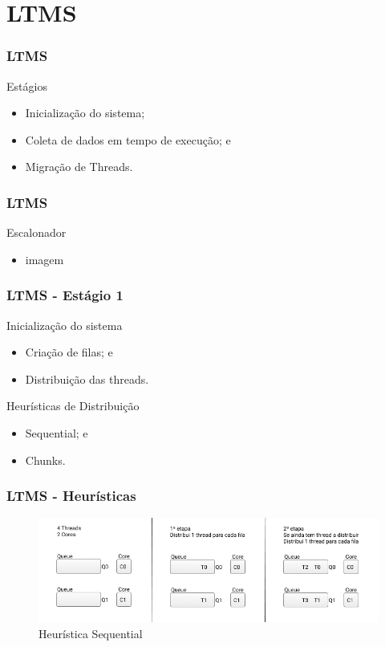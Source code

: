 \documentclass[10pt, pdf,xcolor=pdftex,dvipsnames,table]{beamer}
\begin{document}
\section{LTMS}
\begin{frame} \frametitle{LTMS}
    \begin{block}{Estágios}
        \begin{itemize}
        	\item Inicialização do sistema;
        	\item Coleta de dados em tempo de execução; e
        	\item Migração de Threads.
        \end{itemize}
    \end{block}
\end{frame}

\begin{frame} \frametitle{LTMS}
    \begin{block}{Escalonador}
        \begin{itemize}
        	\item imagem
        \end{itemize}
    \end{block}
\end{frame}

\begin{frame} \frametitle{LTMS - Estágio 1}
    \begin{block}{Inicialização do sistema}
        \begin{itemize}
        	\item Criação de filas; e
        	\item Distribuição das threads.
        \end{itemize}
    \end{block}

    \begin{block}{Heurísticas de Distribuição}
        \begin{itemize}
        	\item Sequential; e
        	\item Chunks.
        \end{itemize}
    \end{block}
\end{frame}

\begin{frame} \frametitle{LTMS - Heurísticas}
    \begin{figure}[!h]
        \includegraphics[scale=0.4]{images/Queue_one}
        \caption{Heurística Sequential}
        \label{fig:abusy}
    \end{figure}
\end{frame}
\end{document}
